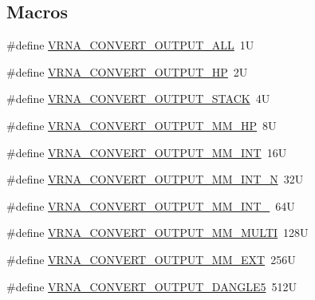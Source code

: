 \subsection*{Macros}
\begin{DoxyCompactItemize}
\item 
\#define \hyperlink{group__energy__parameters__convert_ga8dc6aee5a806c49b71557152f9616bc4}{V\+R\+N\+A\+\_\+\+C\+O\+N\+V\+E\+R\+T\+\_\+\+O\+U\+T\+P\+U\+T\+\_\+\+A\+L\+L}~1\+U
\item 
\#define \hyperlink{group__energy__parameters__convert_gaf66fe2cb11dfcfd32d791049c254a8a4}{V\+R\+N\+A\+\_\+\+C\+O\+N\+V\+E\+R\+T\+\_\+\+O\+U\+T\+P\+U\+T\+\_\+\+H\+P}~2\+U
\item 
\#define \hyperlink{group__energy__parameters__convert_gad23522d63f8d4c50d5a5deee9bee3ef2}{V\+R\+N\+A\+\_\+\+C\+O\+N\+V\+E\+R\+T\+\_\+\+O\+U\+T\+P\+U\+T\+\_\+\+S\+T\+A\+C\+K}~4\+U
\item 
\#define \hyperlink{group__energy__parameters__convert_gaa892c7b4957459090f3e08da298cc347}{V\+R\+N\+A\+\_\+\+C\+O\+N\+V\+E\+R\+T\+\_\+\+O\+U\+T\+P\+U\+T\+\_\+\+M\+M\+\_\+\+H\+P}~8\+U
\item 
\#define \hyperlink{group__energy__parameters__convert_ga4ff223fb1f9c62cd92d9ab811ad03d55}{V\+R\+N\+A\+\_\+\+C\+O\+N\+V\+E\+R\+T\+\_\+\+O\+U\+T\+P\+U\+T\+\_\+\+M\+M\+\_\+\+I\+N\+T}~16\+U
\item 
\#define \hyperlink{group__energy__parameters__convert_gaf5d3743219f83c6348155cd81e755bbb}{V\+R\+N\+A\+\_\+\+C\+O\+N\+V\+E\+R\+T\+\_\+\+O\+U\+T\+P\+U\+T\+\_\+\+M\+M\+\_\+\+I\+N\+T\+\_\+N}~32\+U
\item 
\#define \hyperlink{group__energy__parameters__convert_ga78382ec622ba99e0ac2262317bdd7316}{V\+R\+N\+A\+\_\+\+C\+O\+N\+V\+E\+R\+T\+\_\+\+O\+U\+T\+P\+U\+T\+\_\+\+M\+M\+\_\+\+I\+N\+T\+\_}~64\+U
\item 
\#define \hyperlink{group__energy__parameters__convert_gae67af9f1cdf7baf2865481282a5d1034}{V\+R\+N\+A\+\_\+\+C\+O\+N\+V\+E\+R\+T\+\_\+\+O\+U\+T\+P\+U\+T\+\_\+\+M\+M\+\_\+\+M\+U\+L\+T\+I}~128\+U
\item 
\#define \hyperlink{group__energy__parameters__convert_gaf14ead7ef1fdbe725ade653750fc51e3}{V\+R\+N\+A\+\_\+\+C\+O\+N\+V\+E\+R\+T\+\_\+\+O\+U\+T\+P\+U\+T\+\_\+\+M\+M\+\_\+\+E\+X\+T}~256\+U
\item 
\#define \hyperlink{group__energy__parameters__convert_ga036ffd996d8c8a9acf631760dd1da24b}{V\+R\+N\+A\+\_\+\+C\+O\+N\+V\+E\+R\+T\+\_\+\+O\+U\+T\+P\+U\+T\+\_\+\+D\+A\+N\+G\+L\+E5}~512\+U
\item 

\end{DoxyCompactItemize}
